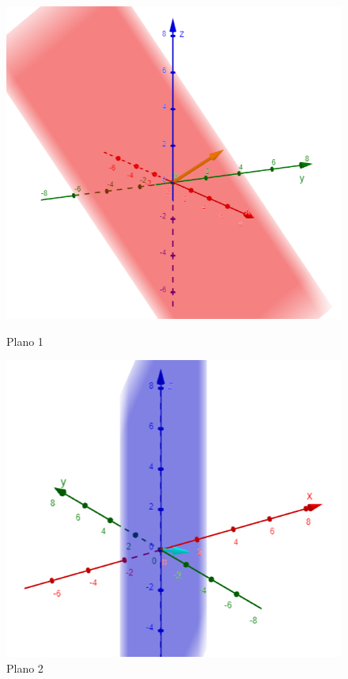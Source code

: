 \documentclass{templateNote}
\begin{document}
\begin{enumerate}
    \begin{figure}[H]
        \begin{minipage}{0.5\textwidth}
          \centering
          \includegraphics[width=0.9\linewidth]{img/Plano1.png}
          \caption{Plano 1}
        \end{minipage}
        \begin{minipage}{0.5\textwidth}
          \centering
          \includegraphics[width=0.9\linewidth]{img/Plano2.png}
          \caption{Plano 2}
        \end{minipage}
      \end{figure}


\end{enumerate}
\end{document}
